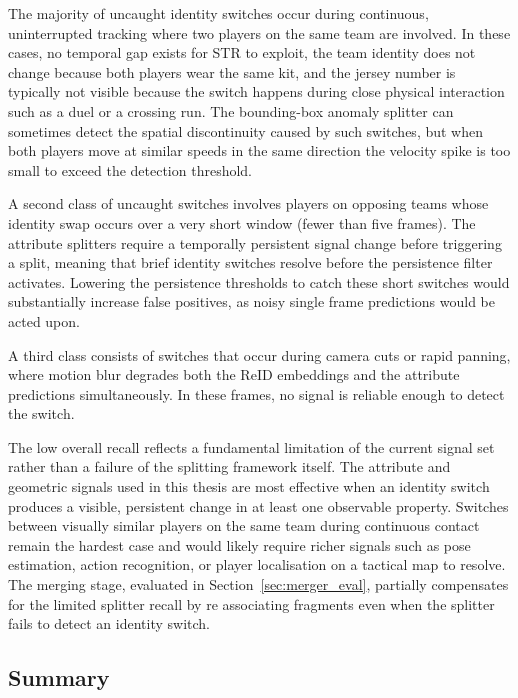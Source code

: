 The majority of uncaught identity switches occur during continuous, uninterrupted tracking where two players on the same team are involved. In these cases, no temporal gap exists for STR to exploit, the team identity does not change because both players wear the same kit, and the jersey number is typically not visible because the switch happens during close physical interaction such as a duel or a crossing run. The bounding-box anomaly splitter can sometimes detect the spatial discontinuity caused by such switches, but when both players move at similar speeds in the same direction the velocity spike is too small to exceed the detection threshold.

A second class of uncaught switches involves players on opposing teams whose identity swap occurs over a very short window (fewer than five frames). The attribute splitters require a temporally persistent signal change before triggering a split, meaning that brief identity switches resolve before the persistence filter activates. Lowering the persistence thresholds to catch these short switches would substantially increase false positives, as noisy single frame predictions would be acted upon.

A third class consists of switches that occur during camera cuts or rapid panning, where motion blur degrades both the ReID embeddings and the attribute predictions simultaneously. In these frames, no signal is reliable enough to detect the switch.

The low overall recall reflects a fundamental limitation of the current signal set rather than a failure of the splitting framework itself. The attribute and geometric signals used in this thesis are most effective when an identity switch produces a visible, persistent change in at least one observable property. Switches between visually similar players on the same team during continuous contact remain the hardest case and would likely require richer signals such as pose estimation, action recognition, or player localisation on a tactical map to resolve. The merging stage, evaluated in Section~\ref{sec:merger_eval}, partially compensates for the limited splitter recall by re associating fragments even when the splitter fails to detect an identity switch.

\subsection{Summary}\label{subsec:splitter_summary}

